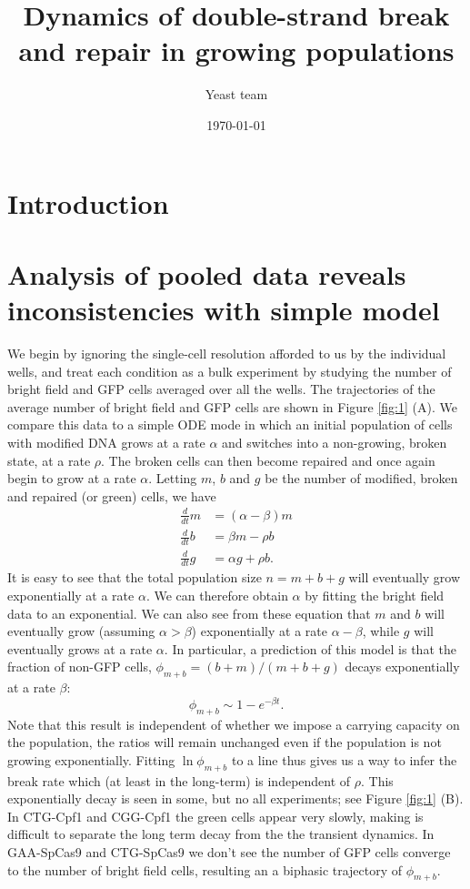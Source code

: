\documentclass{article}
\author[1]{Yeast team}
\affil[1]{Harvard, Pasteur, Peking }
\title{Dynamics of double-strand break and repair in growing populations}
\date{\today}
\makeatletter
\renewcommand{\maketitle}{\bgroup\setlength{\parindent}{0pt}
\begin{flushleft}
  \textbf{\LARGE \@title}

  \@author
\end{flushleft}\egroup
}
\makeatother
\begin{document}
\maketitle
\tableofcontents

\section{Introduction}

\section{Analysis of pooled data reveals inconsistencies with simple model}
We begin by ignoring the single-cell resolution afforded to us by the individual wells, and treat each condition as a bulk experiment by studying the number of bright field and GFP cells averaged over all the wells. The trajectories of the average number of bright field and GFP cells are shown in Figure \ref{fig:1} (A). We compare this data to a simple ODE mode in which an initial population of cells with modified DNA grows at a rate $\alpha$ and switches into a non-growing, broken state, at a rate $\rho$. The broken cells can then become repaired and once again begin to grow at a rate $\alpha$. Letting $m$, $b$ and $g$ be the number of modified, broken and repaired (or green) cells, we have
\begin{align}\label{mbg_ode}
\frac{d}{dt}m &= (\alpha - \beta) m\\
\frac{d}{dt}b &= \beta m - \rho b\\
\frac{d}{dt}g &= \alpha g + \rho b.
\end{align}
It is easy to see that the total population size $n = m+b+g$ will eventually grow exponentially at a rate $\alpha$. We can therefore obtain $\alpha$ by fitting the bright field data to an exponential. We can also see from these equation that $m$ and $b$ will eventually grow (assuming $\alpha> \beta$) exponentially at a rate $\alpha-\beta$, while $g$ will eventually grows at a rate $\alpha$. 
In particular, a prediction of this model is that the fraction of  non-GFP cells, $\phi_{m+b} = (b+m)/(m+b+g)$  decays exponentially at a rate $\beta$:
\begin{equation}
\phi_{m+b} \sim 1- e^{-\beta t}. 
\end{equation}
Note that this result is independent of whether we impose a carrying capacity on the population, the ratios will remain unchanged even if the population is not growing exponentially. 
Fitting $\ln \phi_{m+b}$ to a line thus gives us a way to infer the break rate which (at least in the long-term) is independent of $\rho$. 
This exponentially decay is seen in some, but no all experiments; see Figure \ref{fig:1} (B). In CTG-Cpf1 and CGG-Cpf1 the green cells appear very slowly, making is difficult to separate the long term decay from the the transient dynamics. In GAA-SpCas9 and CTG-SpCas9 we don't see the number of GFP cells converge to the number of bright field cells, resulting an a biphasic trajectory of $\phi_{m+b}$. 
\end{document}
